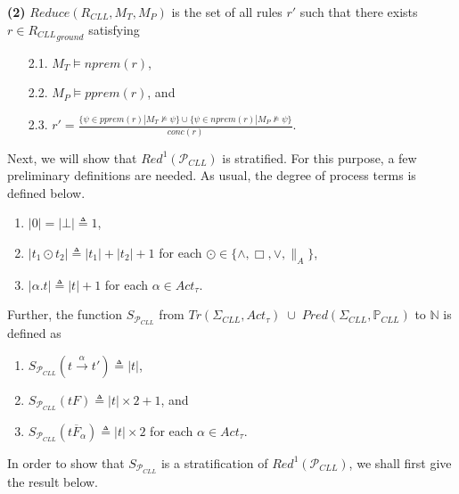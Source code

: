 \documentclass{elsarticle}
\theoremstyle{plain}
\theoremstyle{definition}
\begin{document}
\noindent  \textbf{(2)} $Reduce(R_{CLL},M_T,M_P)$ is the set of all rules $r'$ such that there exists $r\in {R_{CLL}}_{ground}$ satisfying
    \begin{enumerate}
      \item [2.1.] $M_T\models nprem(r)$,
      \item [2.2.] $M_P\models pprem(r)$, and
      \item [2.3.] $r'=\frac{\{\psi \in pprem(r)|M_T\not\models\psi\}\cup\{\psi\in nprem(r)|M_P\not\models\psi\}}{conc(r)}$.
    \end{enumerate}

Next, we will show that $Red^1({\mathcal P}_{CLL})$ is stratified.
For this purpose, a few preliminary definitions are needed.
As usual, the degree of process terms is defined below.
\begin{enumerate}
  \item $|0|=|\bot|\triangleq1$,
  \item $|t_1 \odot t_2|\triangleq|t_1|+|t_2|+1$ for each $\odot \in \{\wedge,\Box,\vee,\parallel_A\}$,
  \item $|\alpha .t|\triangleq|t|+1$ for each $\alpha \in Act_{\tau}$.
\end{enumerate}

Further, the function $S_{{\mathcal P}_{CLL}}$ from  $Tr(\Sigma_{CLL},Act_{\tau})\;\cup\; Pred(\Sigma_{CLL},{\mathbb P}_{CLL})$ to $\mathbb{N}$ is defined as
\begin{enumerate}
  \item $S_{{\mathcal P}_{CLL}}(t\stackrel{\alpha}{\longrightarrow} t')\triangleq|t|$,
  \item $S_{{\mathcal P}_{CLL}}(tF)\triangleq|t|\times 2+1$, and
  \item $S_{{\mathcal P}_{CLL}}(t{\overline F}_{\alpha})\triangleq|t|\times 2$ for each $\alpha \in Act_{\tau}$.
\end{enumerate}

In order to show that $S_{{\mathcal P}_{CLL}}$ is a stratification of $Red^1({\mathcal P}_{CLL})$, we shall first give the result below.
\end{document}
